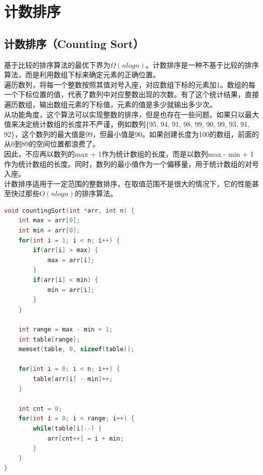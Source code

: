 \section{计数排序}

\subsection{计数排序（Counting Sort）}

基于比较的排序算法的最优下界为$ \Omega(nlogn) $。计数排序是一种不基于比较的排序算法，而是利用数组下标来确定元素的正确位置。\\

遍历数列，将每一个整数按照其值对号入座，对应数组下标的元素加1。数组的每一个下标位置的值，代表了数列中对应整数出现的次数。有了这个统计结果，直接遍历数组，输出数组元素的下标值，元素的值是多少就输出多少次。\\

从功能角度，这个算法可以实现整数的排序，但是也存在一些问题。如果只以最大值来决定统计数组的长度并不严谨，例如数列\{95, 94, 91, 98, 99, 90, 99, 93, 91, 92\}，这个数列的最大值是99，但最小值是90。如果创建长度为100的数组，前面的从0到89的空间位置都浪费了。\\

因此，不应再以数列的max + 1作为统计数组的长度，而是以数列max - min + 1作为统计数组的长度。同时，数列的最小值作为一个偏移量，用于统计数组的对号入座。\\

计数排序适用于一定范围的整数排序，在取值范围不是很大的情况下，它的性能甚至快过那些$ O(nlogn) $的排序算法。\\


\begin{lstlisting}[language=C]
void countingSort(int *arr, int n) {
    int max = arr[0];
    int min = arr[0];
    for(int i = 1; i < n; i++) {
        if(arr[i] > max) {
            max = arr[i];
        }
        if(arr[i] < min) {
            min = arr[i];
        }
    }
    
    int range = max - min + 1;
    int table[range];
    memset(table, 0, sizeof(table));

    for(int i = 0; i < n; i++) {
        table[arr[i] - min]++;
    }

    int cnt = 0;
    for(int i = 0; i < range; i++) {
        while(table[i]--) {
            arr[cnt++] = i + min;
        }
    }
}
\end{lstlisting}

